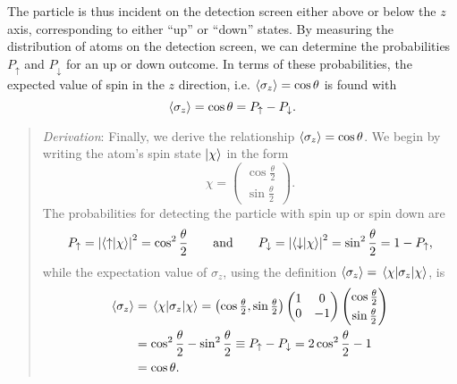 \documentclass[11pt, a4paper]{article}
\newcommand{\ua}{\uparrow}  %
\newcommand{\da}{\downarrow}  %
\begin{document}
\begin{itemize}
    The particle is thus incident on the detection screen either above or below the $ z $ axis, corresponding to either ``up'' or ``down'' states. By measuring the distribution of atoms on the detection screen, we can determine the probabilities $ P_{\ua} $ and $ P_{\da} $ for an up or down outcome. In terms of these probabilities, the expected value of spin in the $ z $ direction, i.e. $ \ev{\sigma_{z}} = \cos \theta $ is found with
    \begin{equation*}
        \ev{\sigma_{z}} = \cos \theta = P_{\ua} - P_{\da}.
    \end{equation*}
    \begin{quote}
        \textit{Derivation}: Finally, we derive the relationship $ \ev{\sigma_{z}} = \cos \theta $. We begin by writing the atom's spin state $ \ket{\chi} $ in the form
        \begin{equation*}
            \chi = 
            \begin{pmatrix}
                \cos \frac{\theta}{2}\\[1mm]
                \sin \frac{\theta}{2}
            \end{pmatrix}.
        \end{equation*}
        The probabilities for detecting the particle with spin up or spin down are
        \begin{equation*}
            P_{\ua} = \abs{\braket{\ua}{\chi}}^{2} = \cos^{2}\frac{\theta}{2} \qquad \text{and} \qquad P_{\da} = \abs{\braket{\da}{\chi}}^{2} = \sin^{2} \frac{\theta}{2} = 1 - P_{\ua},
        \end{equation*}
        while the expectation value of $ \sigma_{z} $, using the definition $ \ev{\sigma_{z}} = \mel{\chi}{\sigma_{z}}{\chi} $, is
        \begin{align*}
            \ev{\sigma_{z}} &= \mel{\chi}{\sigma_{z}}{\chi} = 
            \left( \cos \tfrac{\theta}{2}, \sin \tfrac{\theta}{2} \right) 
            \begin{pmatrix}
                1 & 0\\
                0 & -1
            \end{pmatrix}
            \begin{pmatrix}
                \cos \frac{\theta}{2}\\[1mm]
                \sin \frac{\theta}{2}
            \end{pmatrix}\\
            & = \cos^{2} \frac{\theta}{2} - \sin^{2} \frac{\theta}{2} \equiv P_{\ua} - P_{\da} = 2 \cos^{2} \frac{\theta}{2} - 1\\
            & = \cos \theta.
        \end{align*}
 
    \end{quote}
    
                
    
\end{itemize}
\end{document}
